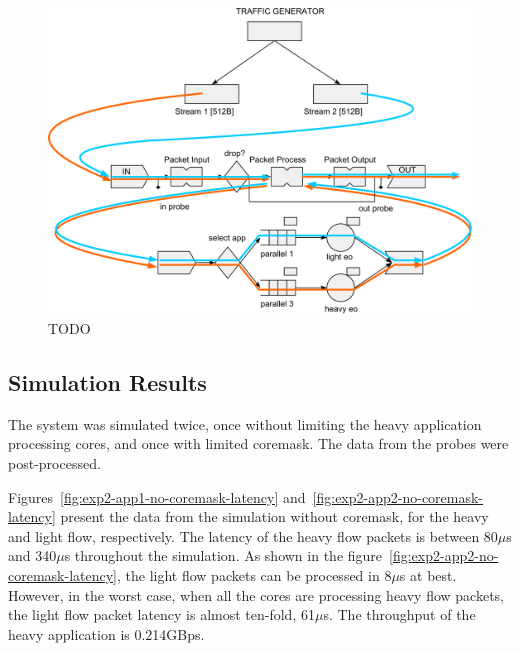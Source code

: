 \begin{figure}[]
  \begin{center}
    \includegraphics[width=\textwidth]{images/pse-models/exp2-software.pdf}
    \caption{TODO}
    \label{fig:exp2-software}
  \end{center}
\end{figure}

\subsection{Simulation Results}
\label{sec:exp2-simulation-results}

The system was simulated twice, once without limiting the heavy application processing cores, and once with limited coremask. The data from the probes were post-processed.

Figures~\ref{fig:exp2-app1-no-coremask-latency} and~\ref{fig:exp2-app2-no-coremask-latency} present the data from the simulation without coremask, for the heavy and light flow, respectively. The latency of the heavy flow packets is between 80$\mu$s and 340$\mu$s throughout the simulation. As shown in the figure~\ref{fig:exp2-app2-no-coremask-latency}, the light flow packets can be processed in 8$\mu$s at best. However, in the worst case, when all the cores are processing heavy flow packets, the light flow packet latency is almost ten-fold, 61$\mu$s. The throughput of the heavy application is 0.214GBps.

